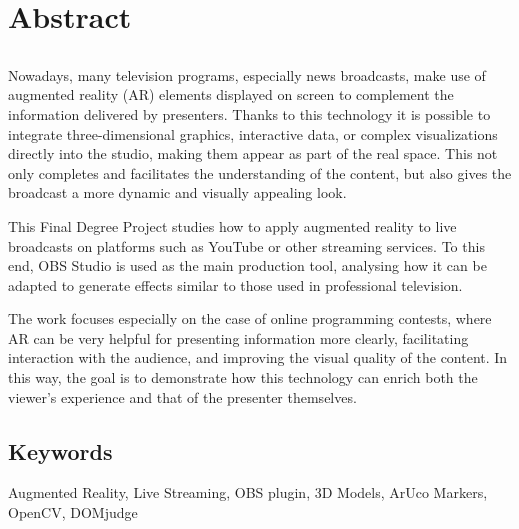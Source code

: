 \chapter*{Abstract}

\section*{\tituloPortadaEngVal}

Nowadays, many television programs, especially news broadcasts, make use of augmented reality (AR) elements displayed on screen to complement the information delivered by presenters. Thanks to this technology it is possible to integrate three-dimensional graphics, interactive data, or complex visualizations directly into the studio, making them appear as part of the real space. This not only completes and facilitates the understanding of the content, but also gives the broadcast a more dynamic and visually appealing look.

This Final Degree Project studies how to apply augmented reality to live broadcasts on platforms such as YouTube or other streaming services. To this end, OBS Studio is used as the main production tool, analysing how it can be adapted to generate effects similar to those used in professional television.

The work focuses especially on the case of online programming contests, where AR can be very helpful for presenting information more clearly, facilitating interaction with the audience, and improving the visual quality of the content. In this way, the goal is to demonstrate how this technology can enrich both the viewer's experience and that of the presenter themselves.

\section*{Keywords}

\noindent Augmented Reality, Live Streaming, OBS plugin, 3D Models, ArUco Markers, OpenCV, DOMjudge


